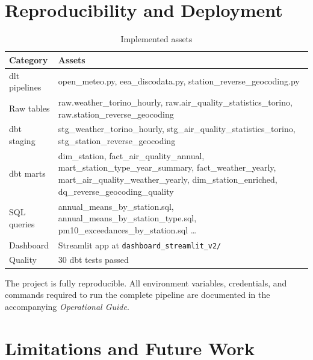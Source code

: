 \documentclass[11pt,a4paper]{article}
\begin{document}
\section{Reproducibility and Deployment}

\begin{table}[h!]
\centering
\caption{Implemented assets}
\small
\begin{tabularx}{\textwidth}{@{}lX@{}}
\toprule
\textbf{Category} & \textbf{Assets} \\
\midrule
dlt pipelines   & open\_meteo.py, eea\_discodata.py, station\_reverse\_geocoding.py \\
Raw tables      & raw.weather\_torino\_hourly, raw.air\_quality\_statistics\_torino, raw.station\_reverse\_geocoding \\
dbt staging     & stg\_weather\_torino\_hourly, stg\_air\_quality\_statistics\_torino, stg\_station\_reverse\_geocoding \\
dbt marts       & dim\_station, fact\_air\_quality\_annual, mart\_station\_type\_year\_summary, \newline
                  fact\_weather\_yearly, mart\_air\_quality\_weather\_yearly, dim\_station\_enriched, dq\_reverse\_geocoding\_quality \\
SQL queries     & annual\_means\_by\_station.sql, annual\_means\_by\_station\_type.sql, pm10\_exceedances\_by\_station.sql \ldots \\
Dashboard       & Streamlit app at \texttt{dashboard\_streamlit\_v2/} \\
Quality         & 30 dbt tests passed \\
\bottomrule
\end{tabularx}
\end{table}

The project is fully reproducible. All environment variables, credentials, and commands required
to run the complete pipeline are documented in the accompanying \textit{Operational Guide}.

\section{Limitations and Future Work}
\end{document}
